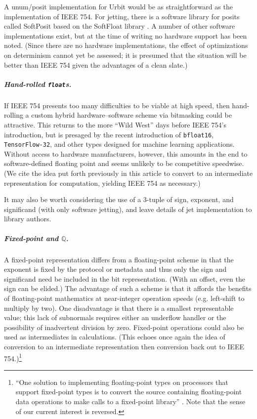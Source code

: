 \documentclass[twoside]{article}
\begin{document}
\citep{Gustafson2015}
\citep{Gustafson2017}
\citep{Posit2022}
\citep{Risse2016}

A unum/posit implementation for Urbit would be as straightforward as the implementation of IEEE 754.  For jetting, there is a software library for posits called SoftPosit based on the SoftFloat library \citep{Cerlane2018}.  A number of other software implementations exist, but at the time of writing no hardware support has been noted.  (Since there are no hardware implementations, the effect of optimizations on determinism cannot yet be assessed; it is presumed that the situation will be better than IEEE 754 given the advantages of a clean slate.)

\subparagraph{Hand-rolled \texttt{float}s.}

If IEEE 754 presents too many difficulties to be viable at high speed, then hand-rolling a custom hybrid hardware–software scheme via bitmasking could be attractive.  This returns to the more “Wild West” days before IEEE 754's introduction, but is presaged by the recent introduction of \texttt{bfloat16}, \texttt{TensorFlow-32}, and other types designed for machine learning applications.  Without access to hardware manufacturers, however, this amounts in the end to software-defined floating point and seems unlikely to be competitive speedwise.  (We cite the idea put forth previously in this article to convert to an intermediate representation for computation, yielding IEEE 754 as necessary.)

It may also be worth considering the use of a 3-tuple of sign, exponent, and significand (with only software jetting), and leave details of jet implementation to library authors.

\subparagraph{Fixed-point and $\mathbb{Q}$.}

A fixed-point representation differs from a floating-point scheme in that the exponent is fixed by the protocol or metadata and thus only the sign and significand need be included in the bit representation.  (With an offset, even the sign can be elided.)  The advantage of such a scheme is that it affords the benefits of floating-point mathematics at near-integer operation speeds (e.g. left-shift to multiply by two).  One disadvantage is that there is a smallest representable value; this lack of subnormals requires either an underflow handler or the possibility of inadvertent division by zero.  Fixed-point operations could also be used as intermediates in calculations.  (This echoes once again the idea of conversion to an intermediate representation then conversion back out to IEEE 754.)\footnote{“One solution to implementing floating-point types on processors that support fixed-point types is to
convert the source containing floating-point data operations to make calls to a fixed-point library” \citep[p.~346]{Jones2008}.  Note that the sense of our current interest is reversed.}
\end{document}
